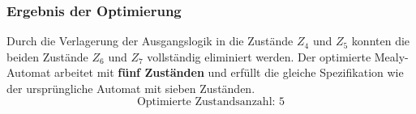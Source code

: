 \subsubsection{Ergebnis der Optimierung}
Durch die Verlagerung der Ausgangslogik in die Zustände \( Z_4 \) und \( Z_5 \) 
konnten die beiden Zustände \( Z_6 \) und \( Z_7 \) vollständig eliminiert werden. 
Der optimierte Mealy-Automat arbeitet mit \textbf{fünf Zuständen} und erfüllt 
die gleiche Spezifikation wie der ursprüngliche Automat mit sieben Zuständen. \hspace{4cm} \[\boxed{ \text{Optimierte Zustandsanzahl: } 5 }\]

